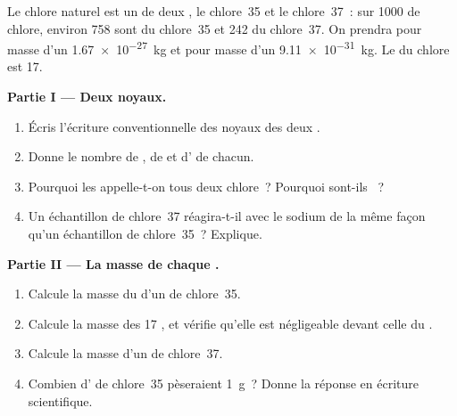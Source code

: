 \begin{problem}
\label{pb:g9:inside-the-atom:1}
Le chlore naturel est un  de deux , le chlore~35 et le
chlore~37~: sur 1000  de chlore, environ 758 sont du chlore~35 et
242 du chlore~37. On prendra pour masse d'un  \qty{1.67e-27}{kg}
et pour masse d'un  \qty{9.11e-31}{kg}. Le  du
chlore est 17.

\medskip
\noindent\textbf{Partie I --- Deux noyaux.}
\begin{enumerate}
  \item Écris l'écriture conventionnelle des noyaux des deux .
  \item Donne le nombre de , de  et d' de chacun.
  \item Pourquoi les appelle-t-on tous deux chlore~? Pourquoi sont-ils
        ~?
  \item Un échantillon de chlore~37 réagira-t-il avec le sodium de la
        même façon qu'un échantillon de chlore~35~? Explique.
\end{enumerate}

\medskip
\noindent\textbf{Partie II --- La masse de chaque .}
\begin{enumerate}[resume]
  \item Calcule la masse du  d'un  de chlore~35.
  \item Calcule la masse des 17 , et vérifie qu'elle est
        négligeable devant celle du .
  \item Calcule la masse d'un  de chlore~37.
  \item Combien d' de chlore~35 pèseraient \qty{1}{g}~? Donne la
        réponse en écriture scientifique.
\end{enumerate}


\end{problem}
